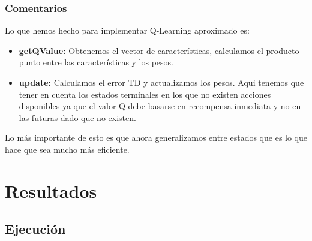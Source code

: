 \documentclass{report}
\begin{document}
      \subsection*{Comentarios}
      Lo que hemos hecho para implementar Q-Learning aproximado es:
        \begin{itemize}
          \item \textbf{getQValue:} Obtenemos el vector de características, calculamos el producto punto entre las características y los pesos.
          \item \textbf{update:} Calculamos el error TD y actualizamos los pesos. Aqui tenemos que tener en cuenta los estados terminales en los que no existen acciones disponibles ya que el valor Q debe basarse en recompensa inmediata y no en las futuras dado que no existen.
        \end{itemize}
      Lo más importante de esto es que ahora generalizamos entre estados que es lo que hace que sea mucho más eficiente.
  \chapter{Resultados} %
    \section{Ejecución} %
\end{document}
